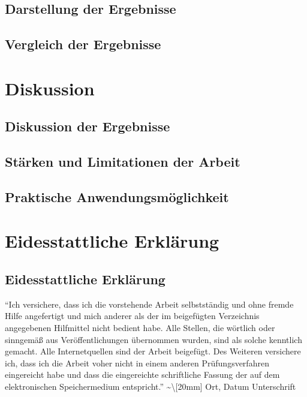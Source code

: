 \documentclass[
  11pt,
]{report}
\begin{document}
\section{Darstellung der Ergebnisse}\label{darstellung-der-ergebnisse}

\section{Vergleich der Ergebnisse}\label{vergleich-der-ergebnisse}

\chapter{Diskussion}\label{diskussion}

\section{Diskussion der Ergebnisse}\label{diskussion-der-ergebnisse}

\section{Stärken und Limitationen der
Arbeit}\label{stuxe4rken-und-limitationen-der-arbeit}

\section{Praktische
Anwendungsmöglichkeit}\label{praktische-anwendungsmuxf6glichkeit}

\chapter{Eidesstattliche Erklärung}\label{eidesstattliche-erkluxe4rung}

\section*{Eidesstattliche Erklärung}

``Ich versichere, dass ich die vorstehende Arbeit selbstständig und ohne
fremde Hilfe angefertigt und mich anderer als der im beigefügten
Verzeichnis angegebenen Hilfmittel nicht bedient habe. Alle Stellen, die
wörtlich oder sinngemäß aus Veröffentlichungen übernommen wurden, sind
als solche kenntlich gemacht. Alle Internetquellen sind der Arbeit
beigefügt. Des Weiteren versichere ich, dass ich die Arbeit voher nicht
in einem anderen Prüfungsverfahren eingereicht habe und dass die
eingereichte schriftliche Fassung der auf dem elektronischen
Speichermedium entspricht.'' \textasciitilde\textbackslash{[}20mm{]}
Ort, Datum\hspace{4cm} Unterschrift
\end{document}
